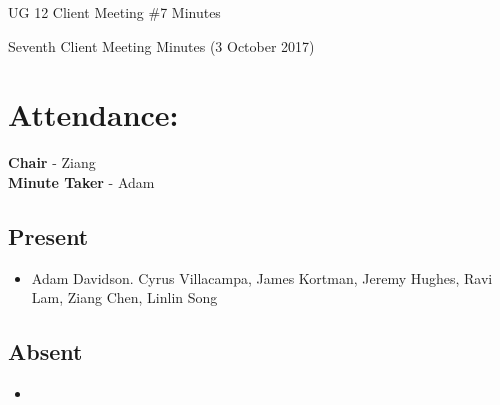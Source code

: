 \documentclass{article}
\begin{document}
\begin{adjustwidth}{2.5em}{0pt}
\begin{center}
\Large{UG 12 Client Meeting \#7 Minutes}\\
\end{center}
\end{adjustwidth}


Seventh Client Meeting Minutes (3 October 2017)
\section{Attendance:}
\textbf{Chair} - Ziang\\
\textbf{Minute Taker} - Adam\\
\subsection*{Present}
\begin{itemize}
\item Adam Davidson. Cyrus Villacampa, James Kortman, Jeremy Hughes, Ravi Lam, Ziang Chen, Linlin Song
\end{itemize}
\subsection*{Absent}
\begin{itemize}
\item  
\end {itemize}
\end{document}
